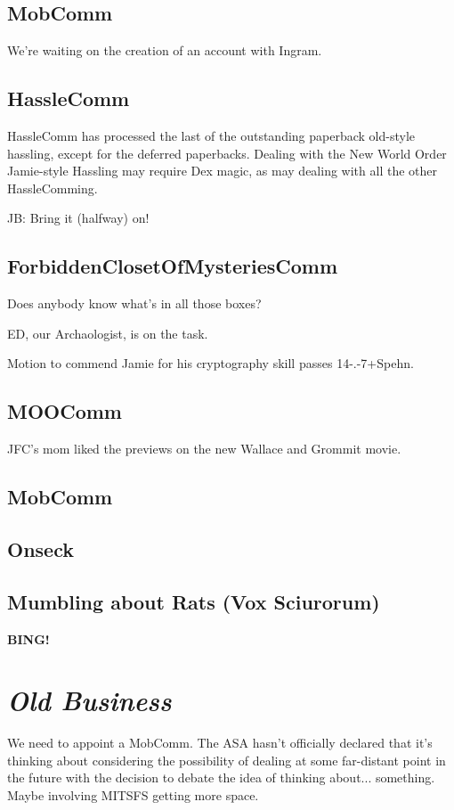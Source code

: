 \documentclass[10pt]{article}
\newcommand{\bing}{{\bf BING!} }
\newcommand{\goto}[1]{\bing \vskip 12pt \section*{{\em{#1}}}}
\begin{document}
\subsection*{MobComm}
We're waiting on the creation of an account with Ingram.

\subsection*{HassleComm}
HassleComm has processed the last of the outstanding paperback old-style hassling, except for 
the deferred paperbacks.  Dealing with the New World Order Jamie-style Hassling may require
Dex magic, as may dealing with all the other HassleComming.

JB: Bring it (halfway) on!

\subsection*{ForbiddenClosetOfMysteriesComm}
Does anybody know what's in all those boxes?  

ED, our Archaologist, is on the task.

Motion to commend Jamie for his cryptography skill passes 14-.-7+Spehn.

\subsection*{MOOComm}
JFC's mom liked the previews on the new Wallace and Grommit movie.

\subsection*{MobComm}

\subsection*{Onseck}

\subsection*{Mumbling about Rats (Vox Sciurorum)}

\goto{Old Business}

We need to appoint a MobComm.  The ASA hasn't officially declared that it's thinking about 
considering the possibility of dealing at some far-distant point in the future with the 
decision to debate the idea of thinking about... something.  Maybe involving MITSFS getting more
space.
\end{document}
